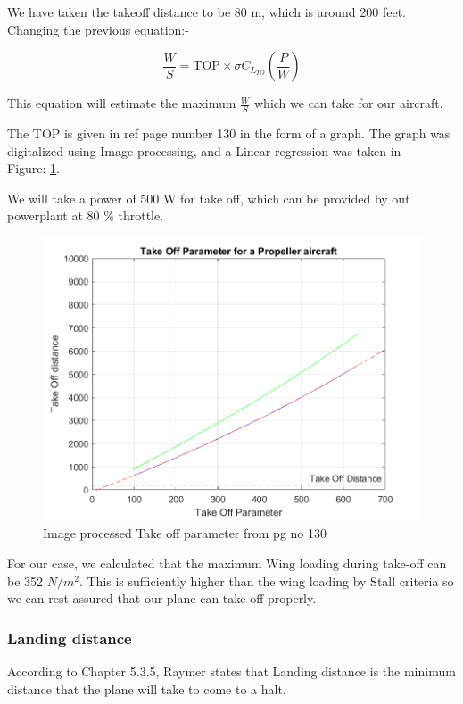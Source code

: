 \documentclass[12 pt]{article}
\begin{document}
We have taken the takeoff distance to be 80 m, which is around 200 feet. Changing the previous equation:-

$$ \frac{W}{S} = \text{TOP} \times \sigma C_{L_{TO}} \left( \frac{P}{W} \right) $$

This equation will estimate the maximum $\frac{W}{S}$ which we can take for our aircraft.

The TOP is given in ref \cite{Raymer.2006} page number 130 in the form of a graph. The graph was digitalized using Image processing, and a Linear regression was taken in Figure:-\ref{Image processed Take off parameter}. 

We will take a power of 500 W for take off, which can be provided by out powerplant at 80 \% throttle. 

\newpage

\begin{figure}[h]
    \centering
    \includegraphics[width=0.8\linewidth]{Codes/Week 2/Takeoffparam.png}
    \caption{Image processed Take off parameter from \protect\cite{Raymer.2006} pg no 130}
    \label{Image processed Take off parameter}
\end{figure}


For our case, we calculated that the maximum Wing loading during take-off can be 352 $N/m^2$. This is sufficiently higher than the wing loading by Stall criteria so we can rest assured that our plane can take off properly.

\subsubsection{Landing distance}

According to \cite{Raymer.2006} Chapter 5.3.5, Raymer states that Landing distance is the minimum distance that the plane will take to come to a halt.
\end{document}
